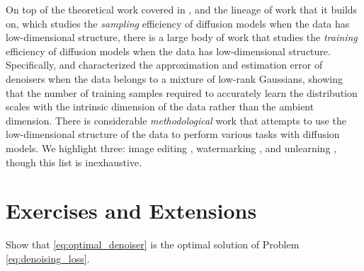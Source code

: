\documentclass[../../book-main.tex]{subfiles}
\begin{document}
On top of the theoretical work \citep{li2024d} covered in
, and the lineage of work that it builds
on, which studies the \textit{sampling} efficiency of diffusion
models when the data has low-dimensional structure, there is a large
body of work that studies the \textit{training} efficiency of
diffusion models when the data has low-dimensional structure.
Specifically, \citet{chen2023score} and \citet{wang2024diffusion}
characterized the approximation and estimation error of denoisers
when the data belongs to a mixture of low-rank Gaussians, showing
that the number of training samples required to accurately learn the
distribution scales with the intrinsic dimension of the
data rather than the ambient dimension. There is considerable
\textit{methodological} work that attempts to use the
low-dimensional structure of the data to perform various tasks with
diffusion models. We highlight three: image editing
\citep{chen2024exploring}, watermarking \citep{li2024shallow}, and
unlearning \citep{chen2025dual}, though this list is inexhaustive.

\section{Exercises and Extensions}

\begin{exercise}
    Show that \eqref{eq:optimal_denoiser} is the optimal solution
    of Problem \eqref{eq:denoising_loss}.
\end{exercise}
\end{document}
